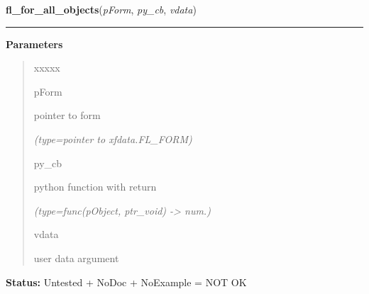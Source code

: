 \hspace{.8\funcindent}\begin{boxedminipage}{\funcwidth}

    \raggedright \textbf{fl\_for\_all\_objects}(\textit{pForm}, \textit{py\_cb}, \textit{vdata})

    \vspace{-1.5ex}

    \rule{\textwidth}{0.5\fboxrule}
\setlength{\parskip}{2ex}
\setlength{\parskip}{1ex}
      \textbf{Parameters}
      \vspace{-1ex}

      \begin{quote}
        \begin{Ventry}{xxxxx}

          \item[pForm]

          pointer to form

            {\it (type=pointer to xfdata.FL\_FORM)}

          \item[py\_cb]

          python function with return

            {\it (type=func(pObject, ptr\_void) -{\textgreater} num.)}

          \item[vdata]

          user data argument

        \end{Ventry}

      \end{quote}

\textbf{Status:} Untested + NoDoc + NoExample = NOT OK



    \end{boxedminipage}

    \label{xformslib:library:fl_set_object_dblclick}

    \vspace{0.5ex}

